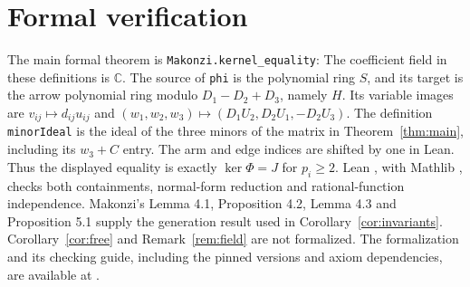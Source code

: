 \documentclass[11pt]{article}
\theoremstyle{remark}
\newcommand{\CC}{\mathbb C}
\begin{document}
\section{Formal verification}
The main formal theorem is \texttt{Makonzi.kernel\_equality}:
The coefficient field in these definitions is $\CC$. The source of
\texttt{phi} is the polynomial ring $S$, and its target is the arrow
polynomial ring modulo $D_1-D_2+D_3$, namely $H$. Its variable images are
$v_{ij}\mapsto d_{ij}u_{ij}$ and
$(w_1,w_2,w_3)\mapsto(D_1U_2,D_2U_1,-D_2U_3)$.
The definition \texttt{minorIdeal} is the ideal of the three minors of
the matrix in Theorem~\ref{thm:main}, including its $w_3+C$ entry.
The arm and edge indices are shifted by one in Lean. Thus the displayed equality
is exactly $\ker\Phi=J$ for $p_i\ge2$.
Lean \cite{Lean4}, with Mathlib \cite{Mathlib}, checks both
containments, normal-form reduction and rational-function independence.
Makonzi's Lemma 4.1, Proposition 4.2, Lemma 4.3 and Proposition 5.1 supply the generation result
used in Corollary~\ref{cor:invariants}.
Corollary~\ref{cor:free} and Remark~\ref{rem:field} are not formalized.
The formalization and its checking guide, including the pinned versions
and axiom dependencies, are available at \cite{Supplement}.
\end{document}
